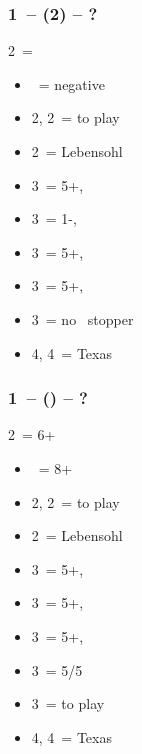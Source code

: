 \documentclass[12pt, a4paper]{report}
\begin{document}
{{{            \subsubsection*{1\ntx\ -- (2\diams) -- ?}
            2\diams\ = \diams
            \begin{itemize}
                \item \dbl\ = negative
                \item 2\hearts, 2\spades\ = to play
                \item 2\nt\ = Lebensohl
                \item 3\clubs\ = 5+\hearts, \invp
                \item 3\diams\ = 1-\diams, \invp
                \item 3\hearts\ = 5+\spades, \invp
                \item 3\spades\ = 5+\clubs, \invp
                \item 3\nt\ = no \diams\ stopper
                \item 4\diams, 4\hearts\ = Texas
            \end{itemize}

            \subsubsection*{1\ntx\ -- (\alrts{2\diams}) -- ?}
            2\diams\ = 6+ \major
            \begin{itemize}
                \item \dbl\ = 8+
                \item 2\hearts, 2\spades\ = to play
                \item 2\nt\ = Lebensohl
                \item 3\clubs\ = 5+\diams, \invp
                \item 3\diams\ = 5+\hearts, \invp
                \item 3\hearts\ = 5+\spades, \invp
                \item 3\spades\ = 5/5 \minor
                \item 3\nt\ = to play
                \item 4\diams, 4\hearts\ = Texas
            \end{itemize}

}}}
\end{document}
